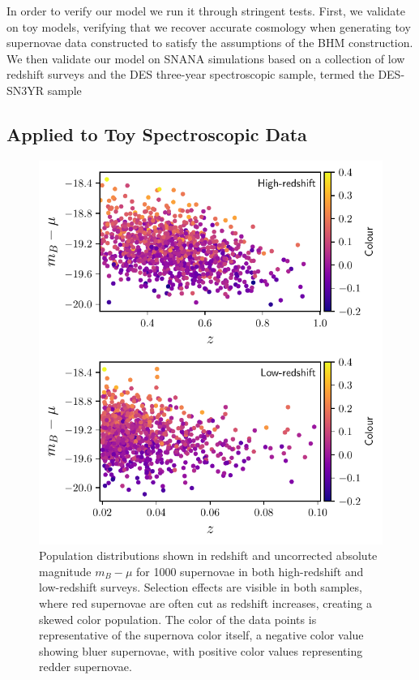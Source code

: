 \documentclass[a4paper,fleqn,usenatbib]{emulateapj}
\begin{document}
In order to verify our model we run it through stringent tests. First, we validate on toy models, verifying that we recover accurate cosmology when generating toy supernovae data constructed to satisfy the assumptions of the BHM construction. We then validate our model on SNANA simulations based on a collection of low redshift surveys and the DES three-year spectroscopic sample, termed the DES-SN3YR sample

\subsection{Applied to Toy Spectroscopic Data}
\label{sec:toy}


\begin{figure}
	\begin{center}
		\includegraphics[width=\columnwidth]{plot_pop_simple.pdf}
	\end{center}
	\caption{Population distributions shown in redshift and uncorrected absolute magnitude $m_B - \mu$ for 1000 supernovae in both high-redshift and low-redshift surveys. Selection effects are visible in both samples, where red supernovae are often cut as redshift increases, creating a skewed color population. The color of the data points is representative of the supernova color itself, a negative color value showing bluer supernovae, with positive color values representing redder supernovae.}
	\label{fig:simple_pop}
\end{figure}
\end{document}
